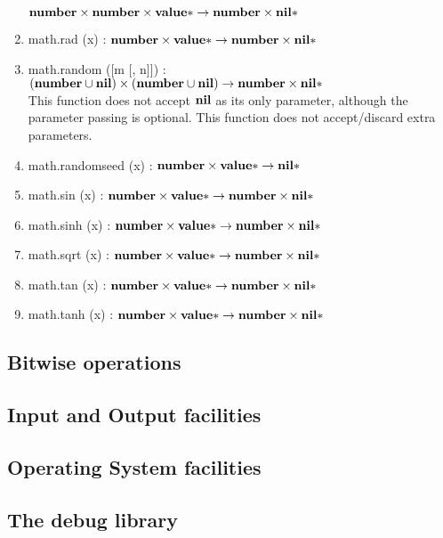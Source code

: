 \begin{enumerate}
$\mathbf{number} \times \mathbf{number} \times \mathbf{value}{*} \rightarrow \mathbf{number} \times \mathbf{nil}{*}$
\item math.rad (x) :
$\mathbf{number} \times \mathbf{value}{*} \rightarrow \mathbf{number} \times \mathbf{nil}{*}$
\item math.random ([m [, n]]) :
$(\mathbf{number} \cup \mathbf{nil}) \times
(\mathbf{number} \cup \mathbf{nil}) \rightarrow
\mathbf{number} \times
\mathbf{nil}{*}$
\\
This function does not accept $\mathbf{nil}$ as its only parameter,
although the parameter passing is optional.
This function does not accept/discard extra parameters.
\item math.randomseed (x) :
$\mathbf{number} \times \mathbf{value}{*} \rightarrow \mathbf{nil}{*}$
\item math.sin (x) :
$\mathbf{number} \times \mathbf{value}{*} \rightarrow \mathbf{number} \times \mathbf{nil}{*}$
\item math.sinh (x) :
$\mathbf{number} \times \mathbf{value}{*} \rightarrow \mathbf{number} \times \mathbf{nil}{*}$
\item math.sqrt (x) :
$\mathbf{number} \times \mathbf{value}{*} \rightarrow \mathbf{number} \times \mathbf{nil}{*}$
\item math.tan (x) :
$\mathbf{number} \times \mathbf{value}{*} \rightarrow \mathbf{number} \times \mathbf{nil}{*}$
\item math.tanh (x) :
$\mathbf{number} \times \mathbf{value}{*} \rightarrow \mathbf{number} \times \mathbf{nil}{*}$
\end{enumerate}

\subsection{Bitwise operations}

\subsection{Input and Output facilities}

\subsection{Operating System facilities}

\subsection{The debug library}
